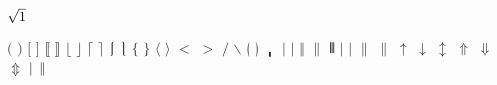 \documentclass[captions=tableheading]{scrartcl}
\begin{document}
$\sqrtsign{1}$

$($
$)$
$[$
$]$
$\lBrack$
\let\dlb\lBrack
$\rBrack$
\let\drb\rBrack
$\lfloor$
$\rfloor$
$\lceil$
$\rceil$
$\lmoustache$
$\rmoustache$
$\lbrace$
$\rbrace$
$\langle$
$\rangle$
$<$
$>$
$/$
$\backslash$
$\lgroup$
$\rgroup$
$\bracevert$
$|$
$\vert$
$\Vert$
$\|$
$\Vvert$
$\lvert$
$\rvert$
$\lVert$
$\rVert$
$\uparrow$
$\downarrow$
$\updownarrow$
$\Uparrow$
$\Downarrow$
$\Updownarrow$
$\arrowvert$
$\Arrowvert$

\end{document}
